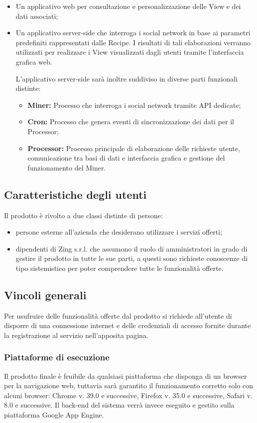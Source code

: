 \begin{itemize}
\item Un applicativo web per consultazione e personalizzazione delle View e dei dati associati;
\item Un applicativo server-side che interroga i social network in base ai parametri predefiniti rappresentati dalle Recipe. I risultati di tali elaborazioni verranno utilizzati per realizzare i View visualizzati dagli utenti tramite l'interfaccia grafica web.

L'applicativo server-side sarà inoltre suddiviso in diverse parti funzionali distinte:
\begin{itemize}
\item \textbf{Miner:} Processo che interroga i social network tramite API dedicate;
\item \textbf{Cron:} Processo che genera eventi di sincronizzazione dei dati per il Processor;
\item \textbf{Processor:} Processo principale di elaborazione delle richieste utente, comunicazione tra basi di dati e interfaccia grafica e gestione del funzionamento del Miner.
\end{itemize}

\end{itemize}

\subsection{Caratteristiche degli utenti}
Il prodotto è rivolto a due classi distinte di persone:

\begin{itemize}
\item persone esterne all'azienda che desiderano utilizzare i servizi offerti;
\item dipendenti di Zing s.r.l. che assumono il ruolo di amministratori in grado di gestire il prodotto in tutte le sue parti, a questi sono richieste conoscenze di tipo sistemistico per poter comprendere tutte le funzionalità offerte.
\end{itemize}


\subsection{Vincoli generali}
Per usufruire delle funzionalità offerte dal prodotto si richiede all'utente di disporre
di una connessione internet e delle credenziali di accesso fornite durante la registrazione al servizio nell'apposita pagina.

\subsubsection{Piattaforme di esecuzione}
Il prodotto finale è fruibile da qualsiasi piattaforma che disponga di un browser per la navigazione web, tuttavia sarà garantito il funzionamento corretto solo con alcuni browser: Chrome v. 39.0 e successive, Firefox v. 35.0 e successive, Safari v. 8.0 e successive.
Il back-end del sistema verrà invece eseguito e gestito sulla piattaforma Google App Engine.
